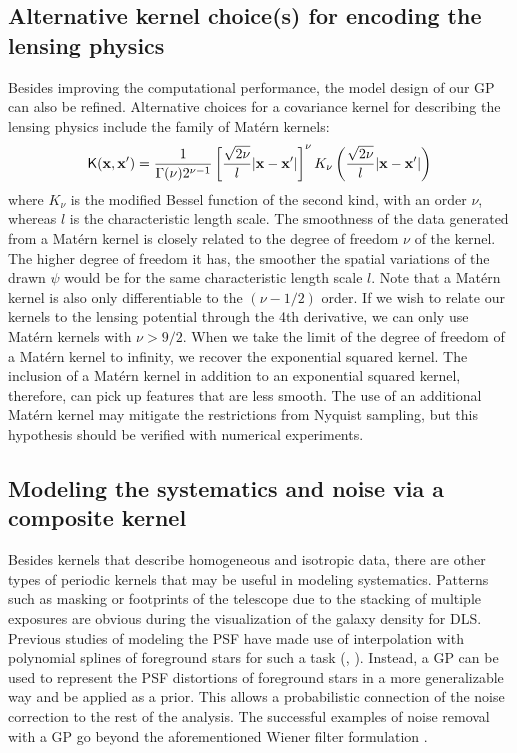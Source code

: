 \subsection{Alternative kernel choice(s) for encoding the lensing physics}
Besides improving the computational performance, the model design of our GP can
also be refined.
Alternative choices for a covariance kernel for describing the lensing physics 
include the family of Mat\'{e}rn kernels:
\begin{equation}
	\mathsf{K}(\mathbf{x}, \mathbf{x}') = \frac{1}{\Gamma(\nu)2^{\nu-1}}\left[
		\frac{\sqrt{2\nu}}{l}|\mathbf{x} - \mathbf{x}'|
	\right]^\nu K_\nu \left(\frac{\sqrt{2\nu}}{l}|\mathbf{x}-\mathbf{x}'|\right) 
\end{equation}
where $K_\nu$ is the modified Bessel function of the second kind, with an order
$\nu$, whereas $l$ is the characteristic length scale.
The smoothness of the data generated from a Mat\'{e}rn kernel is closely
related to the degree of freedom $\nu$ of the kernel. 
The higher degree of freedom it has, the smoother the spatial variations of the
drawn $\psi$ would be for the same characteristic length scale $l$.
Note that a Mat\'{e}rn kernel is also only differentiable to the $(\nu-1/2)$ order.
If we wish to relate our kernels to the lensing potential through the 4th
derivative, we can only use Mat\'{e}rn kernels with $\nu > 9/2$. 
When we take the limit of the degree of freedom of a Mat\'{e}rn kernel to infinity, 
we recover the exponential squared kernel. The inclusion of a Mat\'{e}rn kernel
in addition to an exponential squared kernel, therefore, can pick up features
that are less smooth. The use of an additional Mat\'{e}rn kernel may mitigate the
restrictions from Nyquist sampling, but this hypothesis should be verified with
numerical experiments. 

 

\subsection{Modeling the systematics and noise via a composite kernel}
Besides kernels that describe homogeneous and isotropic data,
there are other types of periodic kernels that may be useful
in modeling systematics. 
Patterns such as masking or footprints of the telescope due to the
stacking of multiple exposures are obvious during the visualization of the
galaxy density for DLS. 
Previous studies of modeling the PSF
have made use of interpolation with polynomial splines of foreground stars 
for such a task (\citealt{Rowe2010},
\citealt{Jee2013a}).  Instead, a GP can be used to represent the PSF distortions
of foreground stars in a more generalizable way and be
applied as a prior. This allows a probabilistic connection of the noise correction to the rest of the
analysis. The successful examples of noise removal with a GP go beyond 
the aforementioned Wiener filter formulation \citep{Perez-Cruz2013}.


